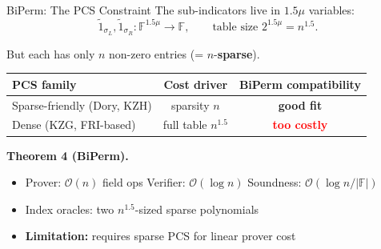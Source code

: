 \documentclass[aspectratio=169,10pt]{beamer}
\newcommand{\F}{\mathbb{F}}
\newcommand{\wt}[1]{\widetilde{#1}}
\newcommand{\bigO}{\mathcal{O}}
\begin{document}
\begin{frame}{BiPerm: The PCS Constraint}
The sub-indicators live in $1.5\mu$ variables:
\[
  \wt{1}_{\sigma_L}, \wt{1}_{\sigma_R} : \F^{1.5\mu} \to \F, \qquad \text{table size } 2^{1.5\mu} = n^{1.5}.
\]

But each has only $n$ non-zero entries (= $n$-\textbf{sparse}).

\vspace{0.6em}
\begin{center}
\begin{tabular}{lcc}
\toprule
PCS family & Cost driver & BiPerm compatibility \\
\midrule
Sparse-friendly (Dory, KZH) & sparsity $n$ & \textcolor{green!60!black}{\textbf{good fit}} \\
Dense (KZG, FRI-based) & full table $n^{1.5}$ & \textcolor{red}{\textbf{too costly}} \\
\bottomrule
\end{tabular}
\end{center}

\vspace{0.6em}
\textbf{Theorem 4 (BiPerm).}
\begin{itemize}
  \item Prover: $\bigO(n)$ field ops \quad Verifier: $\bigO(\log n)$ \quad Soundness: $\bigO(\log n / |\F|)$
  \item Index oracles: two $n^{1.5}$-sized sparse polynomials
  \item \textbf{Limitation:} requires sparse PCS for linear prover cost
\end{itemize}
\end{frame}
\end{document}
